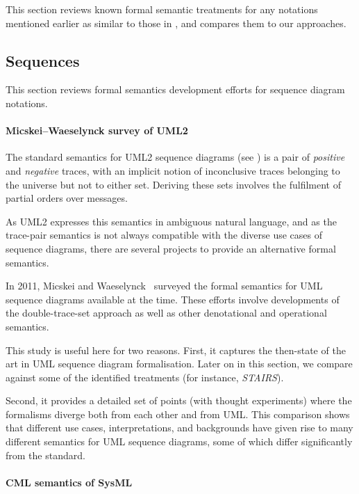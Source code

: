 
This section reviews known formal semantic treatments for any notations
mentioned earlier as similar to those in \langname, and compares them to
our approaches.

\subsection{Sequences}\label{sec:semantics-comparison-review-seq}

This section reviews formal semantics development efforts for sequence diagram
notations.

\paragraph{Micskei--Waeselynck survey of UML2}

The standard semantics for UML2 sequence diagrams (see
\cite[\S 17.2.3.1]{uml251}) is a pair of \emph{positive} and \emph{negative}
traces, with an implicit notion of inconclusive traces belonging to
the universe but not to either set.  Deriving these sets involves the
fulfilment of partial orders over messages.

As UML2 expresses this
semantics in ambiguous natural language, and as the trace-pair
semantics is not always compatible with the diverse use cases of sequence
diagrams, there are several projects to provide an alternative formal semantics.

In 2011, Micskei and Waeselynck~\cite{Micskei11-UMLSeqSemaSurvey} surveyed
the formal semantics for UML sequence diagrams available at the time.  These
efforts involve developments of the double-trace-set approach as well as other
denotational and operational semantics.

This study is useful here for two reasons.  First, it captures the then-state of
the art in UML sequence diagram formalisation.  Later on in this section,
we compare against some of the identified treatments (for instance,
\emph{STAIRS}).

Second, it provides a detailed
set of points (with thought experiments) where the formalisms diverge both from
each other and from UML.
This comparison shows that different use cases, interpretations, and backgrounds
have given rise to many different semantics for UML sequence diagrams, some
of which differ significantly from the standard.

\paragraph{CML semantics of SysML}

